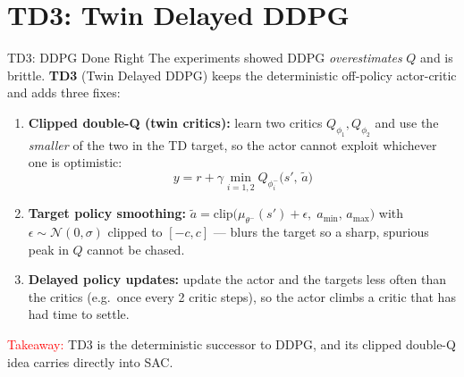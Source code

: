 \section{TD3: Twin Delayed DDPG}
\begin{frame}{TD3: DDPG Done Right }
\vspace{0.3em}
The experiments showed DDPG \emph{overestimates} $Q$ and is brittle. \textbf{TD3} (Twin Delayed DDPG) keeps the deterministic off-policy actor-critic and adds three fixes:
\begin{enumerate}
    \footnotesize
    \setlength{\itemsep}{0.5em}
    \item \textbf{Clipped double-Q (twin critics):} learn two critics $Q_{\phi_1}, Q_{\phi_2}$ and use the \emph{smaller} of the two in the TD target, so the actor cannot exploit whichever one is optimistic:
    \[
    y = r + \gamma \min_{i=1,2} Q_{\phi_i^{-}}\!\big(s',\, \tilde a\big)
    \]
    \item \textbf{Target policy smoothing:} $\tilde a = \mathrm{clip}\big(\mu_{\theta^{-}}(s') + \epsilon,\; a_{\min},\, a_{\max}\big)$ with $\epsilon \sim \mathcal{N}(0,\sigma)$ clipped to $[-c,c]$ --- blurs the target so a sharp, spurious peak in $Q$ cannot be chased.
    \item \textbf{Delayed policy updates:} update the actor and the targets less often than the critics (e.g.\ once every 2 critic steps), so the actor climbs a critic that has had time to settle.
\end{enumerate}
\vspace{0.4em}
\footnotesize\textcolor{red}{Takeaway:} TD3 is the deterministic successor to DDPG, and its clipped double-Q idea carries directly into SAC.
\end{frame}
